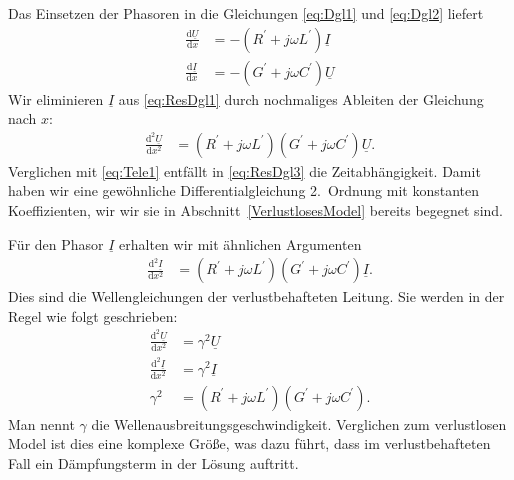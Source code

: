 \documentclass[paper=a4, parskip=half-, ngerman, fontsize=11pt]{scrreprt}
\begin{document}
Das Einsetzen der Phasoren in die Gleichungen \eqref{eq:Dgl1} und \eqref{eq:Dgl2} liefert
\begin{align}
    \frac{\text{d} \underline{U}}{\text{d} x} &= - \left( R^{\prime} + j \omega L^{\prime} \right)
    \underline{I} \label{eq:ResDgl1} \\[1ex]
    \frac{\text{d} \underline{I}}{\text{d} x} &= - \left( G^{\prime} + j \omega C^{\prime} \right) \underline{U}
\end{align}
Wir eliminieren $\underline{I}$ aus \eqref{eq:ResDgl1} durch nochmaliges Ableiten der Gleichung nach $x$:
\begin{align}
    \frac{\text{d}^{2} \underline{U}}{\text{d} x^{2}} &= \left( R^{\prime} + j \omega L^{\prime} \right)
    \left( G^{\prime} + j \omega C^{\prime} \right) \underline{U} \label{eq:ResDgl3}.
\end{align}
Verglichen mit \eqref{eq:Tele1} entfällt in \eqref{eq:ResDgl3} die Zeitabhängigkeit. Damit haben wir eine gewöhnliche
Differentialgleichung 2.~Ordnung mit konstanten Koeffizienten, wir wir sie in Abschnitt~\ref{VerlustlosesModel} bereits
begegnet sind.

Für den Phasor $\underline{I}$ erhalten wir mit ähnlichen Argumenten
\begin{align}
    \frac{\text{d}^{2} \underline{I}}{\text{d} x^{2}} &= \left( R^{\prime} + j \omega L^{\prime} \right)
    \left( G^{\prime} + j \omega C^{\prime} \right) \underline{I}.
\end{align}
Dies sind die Wellengleichungen der verlustbehafteten Leitung. Sie werden in der Regel wie folgt geschrieben:
\begin{align}
    \frac{\text{d}^{2} \underline{U}}{\text{d} x^{2}} &= \gamma^{2} \underline{U} \\[1ex]
    \frac{\text{d}^{2} \underline{I}}{\text{d} x^{2}} &= \gamma^{2} \underline{I} \\[1ex]
    \gamma^{2} &= \left( R^{\prime} + j \omega L^{\prime} \right) \left( G^{\prime} + j \omega C^{\prime} \right).
\end{align}
Man nennt $\gamma$ die Wellenausbreitungsgeschwindigkeit. Verglichen zum verlustlosen Model ist dies eine komplexe
Größe, was dazu führt, dass im verlustbehafteten Fall ein Dämpfungsterm in der Lösung auftritt.
\end{document}
